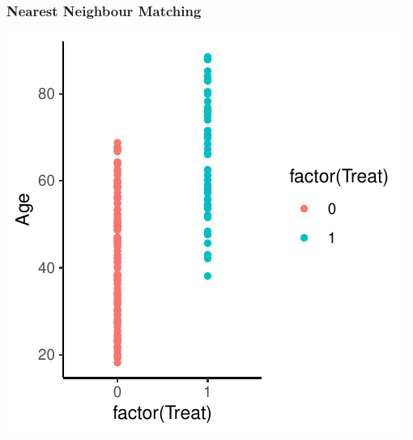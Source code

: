 \documentclass[xcolor=x11names,compress]{beamer}\usepackage[]{graphicx}\usepackage[]{color}
\makeatletter
\def\maxwidth{ %
  \ifdim\Gin@nat@width>\linewidth
    \linewidth
  \else
    \Gin@nat@width
  \fi
}
\newenvironment{knitrout}{}{} %
\renewcommand{\(}{\begin{columns}}
\renewcommand{\)}{\end{columns}}
\newcommand{\<}[1]{\begin{column}{#1}}
\renewcommand{\>}{\end{column}}
\makeatother
\begin{document}
\begin{frame}
\frametitle{Nearest Neighbour Matching}
\begin{center}
\begin{knitrout}
\color{fgcolor}
\includegraphics[width=\maxwidth]{figure/nearest_matching_1-1} 

\end{knitrout}
\end{center}
\end{frame}
\end{document}
